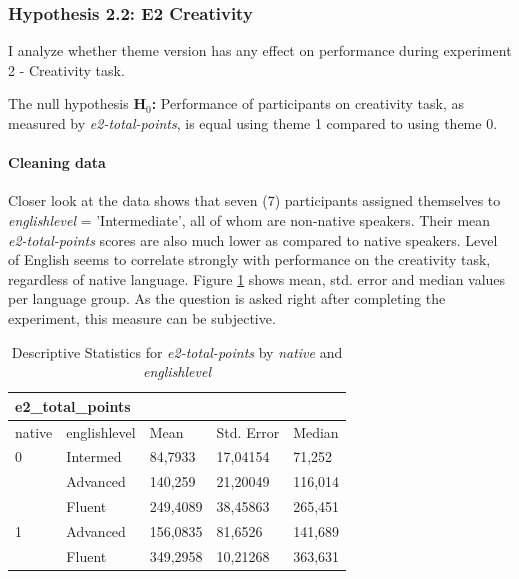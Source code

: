 	
	\subsubsection{Hypothesis 2.2: E2 Creativity}
	
	I analyze whether theme version has any effect on performance during experiment 2 - Creativity task.
	
	The null hypothesis \textbf{H$_{0}$:} Performance of participants on creativity task, as measured by \textit{e2-total-points}, is equal using theme 1 compared to using theme 0.
	
	\paragraph{Cleaning data}
	
	
	Closer look at the data shows that seven (7) participants assigned themselves to \textit{englishlevel} = 'Intermediate', all of whom are non-native speakers. Their mean \textit{e2-total-points} scores are also much lower as compared to native speakers. Level of English seems to correlate strongly with performance on the creativity task, regardless of native language. Figure \ref{tbl:stat-e2-total-points-by-lang} shows mean, std. error and median values per language group. As the question is asked right after completing the experiment, this measure can be subjective.
	
	\begin{table}[]
		\centering
		\begin{tabular}{ll|lll}
			\multicolumn{5}{l}{e2\_total\_points}                   \\ \hline
			native & englishlevel & Mean     & Std. Error & Median  \\ \hline
			0      & Intermed     & 84,7933  & 17,04154   & 71,252  \\
			& Advanced     & 140,259  & 21,20049   & 116,014 \\
			& Fluent       & 249,4089 & 38,45863   & 265,451 \\ \hline
			1      & Advanced     & 156,0835 & 81,6526    & 141,689 \\
			& Fluent       & 349,2958 & 10,21268   & 363,631 \\ \hline \hline
		\end{tabular}
		\caption{Descriptive Statistics for \textit{e2-total-points} by \textit{native} and \textit{englishlevel}}
		\label{tbl:stat-e2-total-points-by-lang}
	\end{table}


